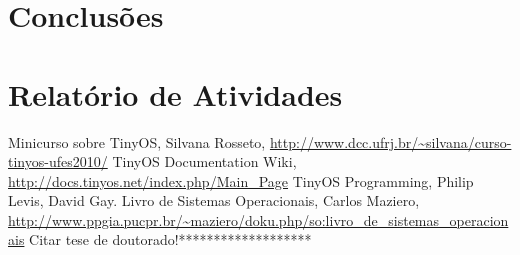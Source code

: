 \documentclass[a4paper,onecolumn, 10pt]{article}
\begin{document}
\section{Conclusões}\label{conclusoes}

\section{Relatório de Atividades}

\pagebreak

\begin{thebibliography}{99}

 Minicurso sobre TinyOS, Silvana Rosseto,
    \url{http://www.dcc.ufrj.br/~silvana/curso-tinyos-ufes2010/} 
 TinyOS Documentation Wiki, \url{http://docs.tinyos.net/index.php/Main_Page}
 TinyOS Programming, Philip Levis, David Gay.
 Livro de Sistemas Operacionais, Carlos Maziero,
    \url{http://www.ppgia.pucpr.br/~maziero/doku.php/so:livro_de_sistemas_operacionais}
 Citar tese de doutorado!*******************

\end{thebibliography}
\end{document}
